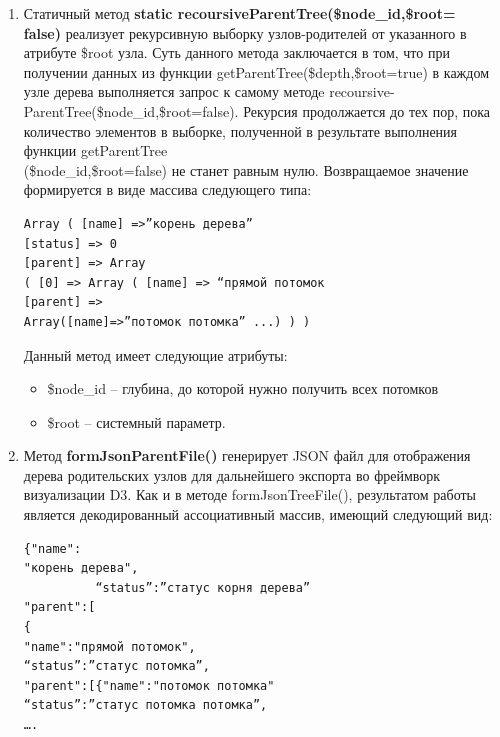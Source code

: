 \documentclass[a4paper,14pt]{extreport}
\theoremstyle{definition}
\begin{document}
\begin{enumerate}
\item Статичный метод \textbf{static recoursiveParentTree(\$node\_id,\$root=\\ false)} реализует рекурсивную выборку узлов-родителей от указанного в атрибуте \$root узла. Суть данного метода заключается в том, что при получении данных из функции getParentTree(\$depth,\$root=true) в каждом узле дерева выполняется запрос к самому методe recoursive-\\ParentTree(\$node\_id,\$root=false). Рекурсия продолжается до тех пор, пока количество элементов в выборке, полученной в результате выполнения функции getParentTree\\(\$node\_id,\$root=false) не станет равным нулю. Возвращаемое значение формируется в виде массива следующего типа:
\begin{verbatim}Array ( [name] =>”корень дерева”
[status] => 0
[parent] => Array
( [0] => Array ( [name] => “прямой потомок
[parent] =>
Array([name]=>”потомок потомка” ...) ) )\end{verbatim}
Данный метод имеет следующие атрибуты:
\begin{itemize}
\item \$node\_id – глубина, до которой нужно получить всех потомков
\item \$root – системный параметр.
\end{itemize}

\item Метод \textbf{formJsonParentFile()} генерирует JSON файл для отображения дерева родительских узлов для дальнейшего экспорта во фреймворк визуализации D3. Как и в методе formJsonTreeFile(), результатом работы является декодированный ассоциативный массив, имеющий следующий вид:\begin{verbatim}
{"name":
"корень дерева",
          “status”:”статус корня дерева”
"parent":[
{
"name":"прямой потомок",
“status”:”статус потомка”,
"parent":[{"name":"потомок потомка"
“status”:”статус потомка потомка”,
….\end{verbatim}


\end{enumerate}
\end{document}
